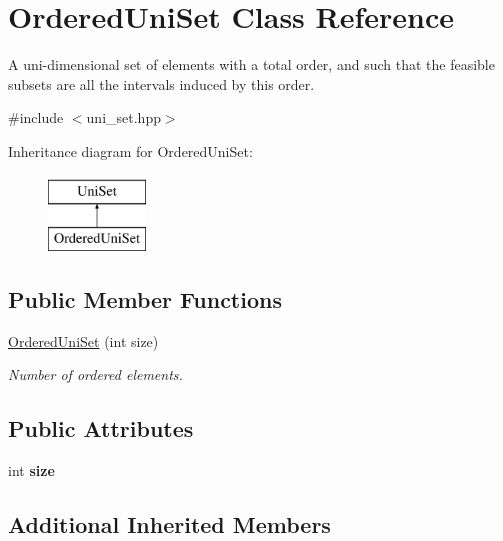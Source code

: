 \hypertarget{classOrderedUniSet}{\section{Ordered\-Uni\-Set Class Reference}
\label{classOrderedUniSet}
}


A uni-\/dimensional set of elements with a total order, and such that the feasible subsets are all the intervals induced by this order.  




{\ttfamily \#include $<$uni\-\_\-set.\-hpp$>$}

Inheritance diagram for Ordered\-Uni\-Set\-:\begin{figure}[H]
\begin{center}
\leavevmode
\includegraphics[height=2.000000cm]{classOrderedUniSet}
\end{center}
\end{figure}
\subsection*{Public Member Functions}
\begin{DoxyCompactItemize}
\item 
\hyperlink{classOrderedUniSet_ac09b90d14eda5aed31fcb11114591ef5}{Ordered\-Uni\-Set} (int size)
\begin{DoxyCompactList}\small\item\em Number of ordered elements. \end{DoxyCompactList}\end{DoxyCompactItemize}
\subsection*{Public Attributes}
\begin{DoxyCompactItemize}
\item 
\hypertarget{classOrderedUniSet_ae0c3867ab74ade7469492b48742adb2a}{int {\bfseries size}}\label{classOrderedUniSet_ae0c3867ab74ade7469492b48742adb2a}

\end{DoxyCompactItemize}
\subsection*{Additional Inherited Members}


